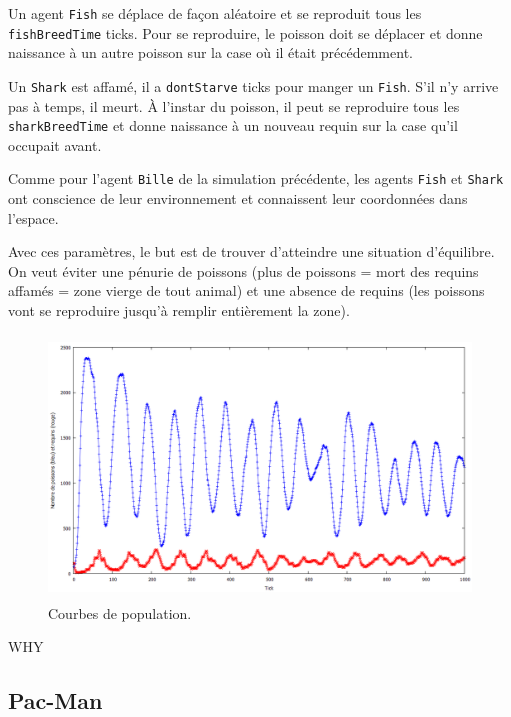 \documentclass[a4paper]{article}
\begin{document}
\medskip
Un agent \texttt{Fish} se déplace de façon aléatoire et se reproduit tous les \texttt{fishBreedTime} ticks. Pour se reproduire, le poisson doit se déplacer et donne naissance à un autre poisson sur la case où il était précédemment.

\medskip
Un \texttt{Shark} est affamé, il a \texttt{dontStarve} ticks pour manger un \texttt{Fish}. S'il n'y arrive pas à temps, il meurt. À l'instar du poisson, il peut se reproduire tous les \texttt{sharkBreedTime} et donne naissance à un nouveau requin sur la case qu'il occupait avant.

\medskip
Comme pour l'agent \texttt{Bille} de la simulation précédente, les agents \texttt{Fish} et \texttt{Shark} ont conscience de leur environnement et connaissent leur coordonnées dans l'espace.

\medskip
Avec ces paramètres, le but est de trouver d'atteindre une situation d'équilibre. On veut éviter une pénurie de poissons (plus de poissons = mort des requins affamés = zone vierge de tout animal) et une absence de requins (les poissons vont se reproduire jusqu'à remplir entièrement la zone).

 
\begin{figure}[!h]
\centering
\includegraphics[height=7cm]{1000tours.png}
\caption{Courbes de population.}
\end{figure}

WHY
\subsection{Pac-Man}
\end{document}

